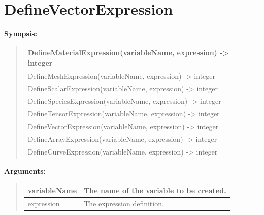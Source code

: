 \documentclass[letterpaper,10pt,english]{sphinxmanual}
\begin{document}
\section{DefineVectorExpression}
\label{functions:definevectorexpression}
\begin{DUlineblock}{0em}
\item[] \textbf{Synopsis:}
\end{DUlineblock}
\begin{quote}

\begin{tabulary}{\linewidth}{|L|}
\hline

DefineMaterialExpression(variableName, expression) -\textgreater{} integer
\\
\hline
DefineMeshExpression(variableName, expression) -\textgreater{} integer
\\
\hline
DefineScalarExpression(variableName, expression) -\textgreater{} integer
\\
\hline
DefineSpeciesExpression(variableName, expression) -\textgreater{} integer
\\
\hline
DefineTensorExpression(variableName, expression) -\textgreater{} integer
\\
\hline
DefineVectorExpression(variableName, expression) -\textgreater{} integer
\\
\hline
DefineArrayExpression(variableName, expression) -\textgreater{} integer
\\
\hline
DefineCurveExpression(variableName, expression) -\textgreater{} integer
\\
\hline\end{tabulary}

\end{quote}

\begin{DUlineblock}{0em}
\item[] 
\item[] \textbf{Arguments:}
\end{DUlineblock}
\begin{quote}

\begin{tabulary}{\linewidth}{|L|L|}
\hline

variableName
 & 
The name of the variable to be created.
\\
\hline
expression
 & 
The expression definition.
\\
\hline\end{tabulary}

\end{quote}
\end{document}

